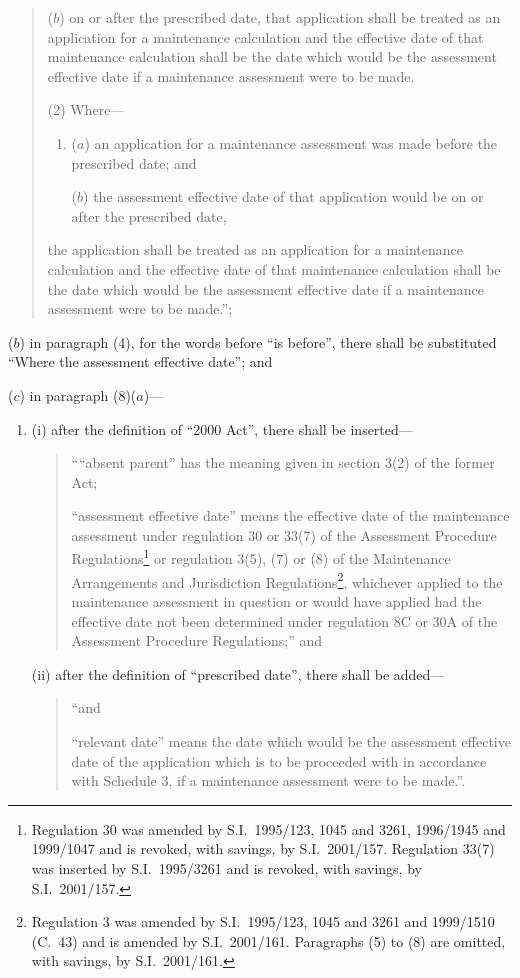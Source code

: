 \documentclass[12pt,a4paper]{article}
\begin{document}
\begin{enumerate}
\begin{quotation}
\begin{enumerate}
($b$) on or after the prescribed date, that application shall be treated as an application for a maintenance calculation and the effective date of that maintenance calculation shall be the date which would be the assessment effective date if a maintenance assessment were to be made.
\end{enumerate}

(2) Where—
\begin{enumerate}\item[]
($a$) an application for a maintenance assessment was made before the prescribed date; and

($b$) the assessment effective date of that application would be on or after the prescribed date,
\end{enumerate}
the application shall be treated as an application for a maintenance calculation and the effective date of that maintenance calculation shall be the date which would be the assessment effective date if a maintenance assessment were to be made.”;
\end{quotation}

($b$) in paragraph (4), for the words before “is before”, there shall be substituted “Where the assessment effective date”; and

($c$) in paragraph (8)($a$)—
\begin{enumerate}\item[]
(i) after the definition of “2000 Act”, there shall be inserted—
\begin{quotation}
““absent parent” has the meaning given in section 3(2) of the former Act;

“assessment effective date” means the effective date of the maintenance assessment under regulation 30 or 33(7) of the Assessment Procedure Regulations\footnote{Regulation 30 was amended by S.I.\ 1995/123, 1045 and 3261, 1996/1945 and 1999/1047 and is revoked, with savings, by S.I.\ 2001/157. Regulation 33(7) was inserted by S.I.\ 1995/3261 and is revoked, with savings, by S.I.\ 2001/157.} or regulation 3(5), (7) or (8) of the Maintenance Arrangements and Jurisdiction Regulations\footnote{Regulation 3 was amended by S.I.\ 1995/123, 1045 and 3261 and 1999/1510 (C.\ 43) and is amended by S.I.\ 2001/161. Paragraphs (5) to (8) are omitted, with savings, by S.I.\ 2001/161.}, whichever applied to the maintenance assessment in question or would have applied had the effective date not been determined under regulation 8C or 30A of the Assessment Procedure Regulations;” and
\end{quotation}

(ii) after the definition of “prescribed date”, there shall be added—
\begin{quotation}
    “and

    “relevant date” means the date which would be the assessment effective date of the application which is to be proceeded with in accordance with Schedule 3, if a maintenance assessment were to be made.”. 
\end{quotation}
\end{enumerate}
\end{enumerate}
\end{document}
